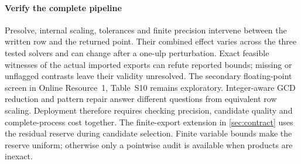 \paragraph{Verify the complete pipeline}
Presolve, internal scaling, tolerances and finite precision intervene between
the written row and the returned point. Their combined effect varies across
the three tested solvers and can change after a one-ulp perturbation. Exact
feasible witnesses of the actual imported exports can refute reported bounds;
missing or unflagged contrasts leave their validity unresolved. The secondary
floating-point screen in Online Resource~1, Table~S10 remains exploratory.
Integer-aware GCD reduction and pattern repair answer different questions from
equivalent row scaling. Deployment therefore requires checking precision,
candidate quality and complete-process cost together.
The finite-export extension in \cref{sec:contract} uses the residual reserve
during candidate selection. Finite variable bounds make the reserve uniform;
otherwise only a pointwise audit is available when products are inexact.
